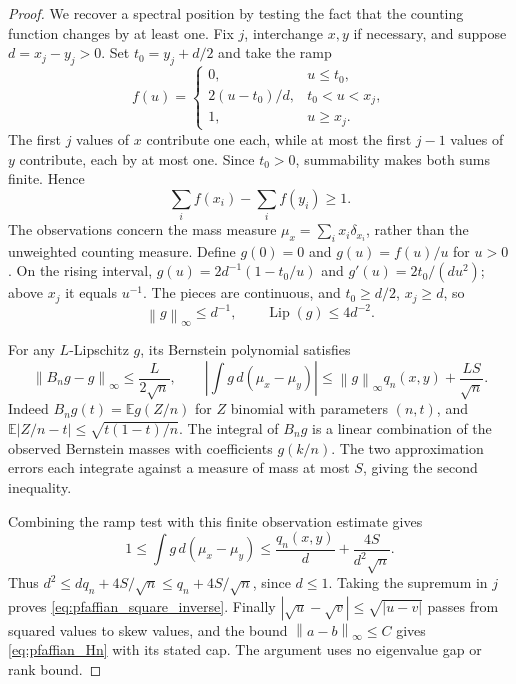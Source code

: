 \documentclass[11pt,a4paper]{amsart}
\numberwithin{equation}{section}
\theoremstyle{definition}
\theoremstyle{remark}
\newcommand{\E}{\mathbb E}
\newcommand{\norm}[1]{\left\lVert#1\right\rVert}
\begin{document}
\begin{proof}
We recover a spectral position by testing the fact that the counting function changes by at least one. Fix $j$, interchange $x,y$ if necessary, and suppose $d=x_j-y_j>0$. Set $t_0=y_j+d/2$ and take the ramp
\[
 f(u)=\begin{cases}
 0,&u\le t_0,\\
 2(u-t_0)/d,&t_0<u<x_j,\\
 1,&u\ge x_j.
 \end{cases}
\]
The first $j$ values of $x$ contribute one each, while at most the first $j-1$ values of $y$ contribute, each by at most one. Since $t_0>0$, summability makes both sums finite. Hence
\begin{equation}\label{eq:pfaffian_integer_gap}
 \sum_i f(x_i)-\sum_i f(y_i)\ge1.
\end{equation}
The observations concern the mass measure $\mu_x=\sum_ix_i\delta_{x_i}$, rather than the unweighted counting measure. Define $g(0)=0$ and $g(u)=f(u)/u$ for $u>0$. On the rising interval,
$g(u)=2d^{-1}(1-t_0/u)$ and $g'(u)=2t_0/(du^2)$; above $x_j$ it equals $u^{-1}$. The pieces are continuous, and $t_0\ge d/2$, $x_j\ge d$, so
\[
 \norm g_\infty\le d^{-1},\qquad \operatorname{Lip}(g)\le4d^{-2}.
\]

For any $L$-Lipschitz $g$, its Bernstein polynomial satisfies
\begin{equation}\label{eq:pfaffian_bernstein_error}
 \norm{B_ng-g}_\infty\le\frac{L}{2\sqrt n},\qquad
 \left|\int g\,d(\mu_x-\mu_y)\right|
 \le\norm g_\infty q_n(x,y)+\frac{LS}{\sqrt n}.
\end{equation}
Indeed $B_ng(t)=\E g(Z/n)$ for $Z$ binomial with parameters $(n,t)$, and
$\E|Z/n-t|\le\sqrt{t(1-t)/n}$. The integral of $B_ng$ is a linear combination of the observed Bernstein masses with coefficients $g(k/n)$. The two approximation errors each integrate against a measure of mass at most $S$, giving the second inequality.

Combining the ramp test with this finite observation estimate gives
\[
 1\le\int g\,d(\mu_x-\mu_y)
 \le\frac{q_n(x,y)}d+\frac{4S}{d^2\sqrt n}.
\]
Thus $d^2\le dq_n+4S/\sqrt n\le q_n+4S/\sqrt n$, since $d\le1$. Taking the supremum in $j$ proves \eqref{eq:pfaffian_square_inverse}. Finally
$|\sqrt u-\sqrt v|\le\sqrt{|u-v|}$
passes from squared values to skew values, and the bound $\norm{a-b}_\infty\le C$ gives \eqref{eq:pfaffian_Hn} with its stated cap. The argument uses no eigenvalue gap or rank bound.
\end{proof}
\end{document}
